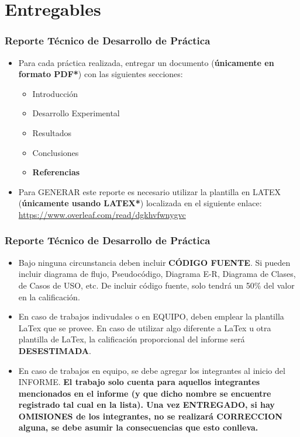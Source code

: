 \documentclass[aspectratio=169]{beamer}
\begin{document}
\section{Entregables}



\begin{frame}
\frametitle{Reporte Técnico de Desarrollo de Práctica}
\begin{itemize}
\item Para cada práctica realizada, entregar un documento (\textbf{únicamente en formato PDF*}) con las siguientes secciones:
\begin{itemize}
\item Introducción
\item Desarrollo Experimental
\item Resultados
\item Conclusiones
\item \textbf{Referencias}
\end{itemize}
\item Para GENERAR este reporte es necesario utilizar la plantilla en LATEX (\textbf{únicamente usando LATEX*}) localizada en el siguiente enlace:
\url{https://www.overleaf.com/read/dgkhvfwnygvc}
\end{itemize}
\end{frame}

\begin{frame}
\frametitle{Reporte Técnico de Desarrollo de Práctica}
\begin{itemize}
\item Bajo ninguna circunstancia deben incluir \textbf{CÓDIGO FUENTE}. Si pueden incluir diagrama de flujo, Pseudocódigo, Diagrama E-R, Diagrama de Clases, de Casos de USO, etc. De incluir código fuente, solo tendrá un 50\% del valor en la calificación. 
\item En caso de trabajos indivudales o en EQUIPO, deben emplear la plantilla LaTex que se provee. En caso de utilizar algo diferente a LaTex u otra plantilla de LaTex, la calificación proporcional del informe será \textbf{DESESTIMADA}. 
\item En caso de trabajos en equipo, se debe agregar los integrantes al inicio del INFORME. \textbf{El trabajo solo cuenta para aquellos integrantes mencionados en el informe (y que dicho nombre se encuentre registrado tal cual en la lista). Una vez ENTREGADO, si hay OMISIONES de los integrantes, no se realizará CORRECCION alguna, se debe asumir la consecuencias que esto conlleva. }
\end{itemize}

\end{frame}
\end{document}
